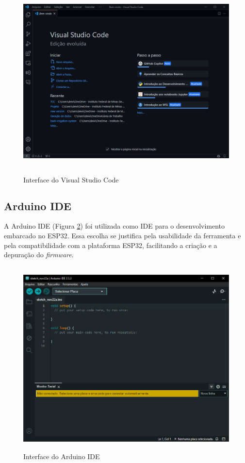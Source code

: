 \begin{figure}[!htb] \centering
  \caption{Interface do Visual Studio Code} \label{figura:vscode}
  \begin{varwidth}{\linewidth}
    \includegraphics[height=10cm, width=16cm]{figuras/vscode.png}
  \end{varwidth}
\end{figure}

\subsection{Arduino IDE}
A Arduino IDE (Figura \ref{figura:arduino-ide}) foi utilizada como IDE para o desenvolvimento embarcado no ESP32. Essa escolha se justifica pela usabilidade da ferramenta e pela compatibilidade com a plataforma ESP32, facilitando a criação e a depuração do \textit{firmware}.

\begin{figure}[!htb] \centering
  \caption{Interface do Arduino IDE} \label{figura:arduino-ide}
  \begin{varwidth}{\linewidth}
    \includegraphics[height=10cm, width=16cm]{figuras/arduino-ide.png}
  \end{varwidth}
\end{figure}

